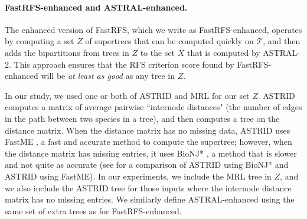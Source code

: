 \paragraph{\bf FastRFS-enhanced and ASTRAL-enhanced.  }
The enhanced version of FastRFS, which we write as
FastRFS-enhanced,  operates by computing a set
$Z$ of supertrees that can be computed quickly on $\mathcal{T}$, 
and then adds the bipartitions from trees in $Z$ to the set $X$
that is computed by ASTRAL-2.
This approach ensures that the RFS criterion score
found by FastRFS-enhanced will be {\em at least as good} as any tree in $Z$.

In our study, we used one or both of ASTRID and MRL for our set $Z$.
ASTRID computes a matrix of average pairwise ``internode distances"
(the number of edges in the path between two species in a tree),
and then computes a tree on the distance matrix.
When the distance matrix has no missing data,
ASTRID uses FastME \cite{Desper2002}, a fast
and accurate method to 
compute the supertree; however, when the 
distance matrix has missing entries, it
uses BioNJ* \cite{phydstar},
a method that is slower and not quite as accurate
(see \cite{ASTRID} for a comparison of ASTRID using 
BioNJ* and ASTRID using FastME).
In our experiments, we 
include the MRL tree in $Z$, and we also 
include the ASTRID tree for those inputs
where the internode distance matrix has no missing entries.
We similarly define ASTRAL-enhanced using the same
set of extra trees as for FastRFS-enhanced.







